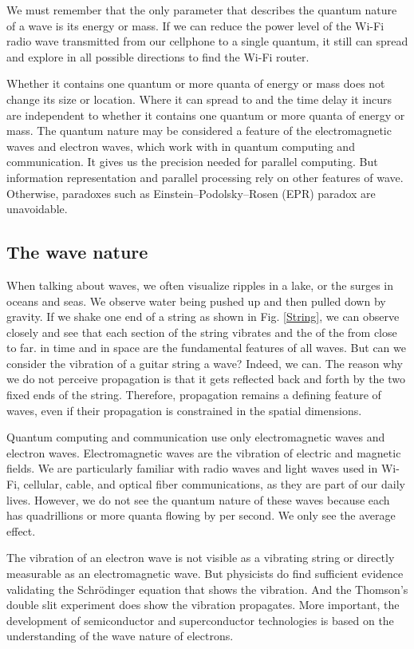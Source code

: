 \documentclass[Letter,11pt]{book}
\begin{document}
We must remember that the only parameter that describes the quantum nature of a wave is its energy or mass. If we can reduce the power level of the Wi-Fi radio wave transmitted from our cellphone to a single quantum, it still can spread and explore in all possible directions to find the Wi-Fi router.


Whether it contains one quantum or more quanta of energy or mass does not change its size or location. Where it can spread to and the time delay it incurs are independent to whether it contains one quantum or more quanta of energy or mass. The quantum nature may be considered a feature of the electromagnetic waves and electron waves, which work with in quantum computing and communication. It gives us the precision needed for parallel computing. But information representation and parallel processing rely on other features of wave. Otherwise, paradoxes such as Einstein–Podolsky–Rosen (EPR) paradox \cite{EPR} are unavoidable.

\subsection{The wave nature}
When talking about waves, we often visualize ripples in a lake, or the surges in oceans and seas. We observe water being pushed up and then pulled down by gravity. If we shake one end of a string as shown in Fig. \ref{String}, we can observe closely and see that each section of the string vibrates and the  of the  from close to far.  in time and  in space are the fundamental features of all waves. But can we consider the vibration of a guitar string a wave? Indeed, we can. The reason why we do not perceive propagation is that it gets reflected back and forth by the two fixed ends of the string. Therefore, propagation remains a defining feature of waves, even if their propagation is constrained in the spatial dimensions.

Quantum computing and communication use only electromagnetic waves and electron waves. Electromagnetic waves are the vibration of electric and magnetic fields. We are particularly familiar with radio waves and light waves used in Wi-Fi, cellular, cable, and optical fiber communications, as they are part of our daily lives. However, we do not see the quantum nature of these waves because each has quadrillions or more quanta flowing by per second. We only see the average effect.

The vibration of an electron wave is not visible as a vibrating string or directly measurable as an electromagnetic wave. But physicists do find sufficient evidence validating the Schrödinger equation that shows the vibration. And the Thomson's double slit experiment\cite{THOMSON} does show the vibration propagates. More important, the development of semiconductor and superconductor technologies is based on the understanding of the wave nature of electrons.
\end{document}
